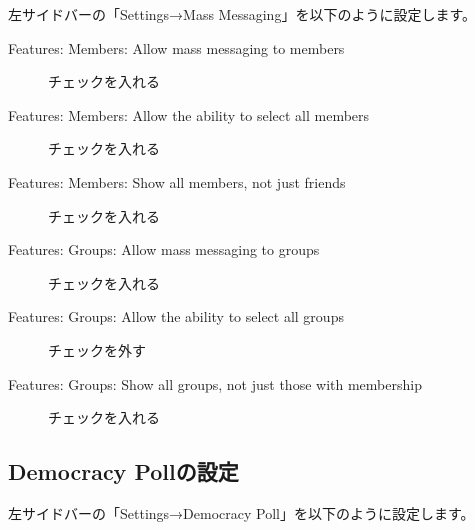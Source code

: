 \documentclass[titlepage,10pt,a4paper,uplatex]{jsbook}
\begin{document}
左サイドバーの「Settings→Mass Messaging」を以下のように設定します。

\begin{description}
\item[Features: Members: Allow mass messaging to members] チェックを入れる
\item[Features: Members: Allow the ability to select all members] チェックを入れる
\item[Features: Members: Show all members, not just friends] チェックを入れる
\item[Features: Groups: Allow mass messaging to groups] チェックを入れる
\item[Features: Groups: Allow the ability to select all groups] チェックを外す
\item[Features: Groups: Show all groups, not just those with membership] チェックを入れる
\end{description}

\subsection{Democracy Pollの設定}

左サイドバーの「Settings→Democracy Poll」を以下のように設定します。
\end{document}
